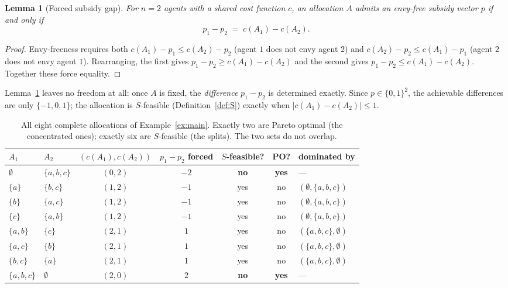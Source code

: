 \documentclass[11pt]{article}
\newtheorem{lemma}[definition]{Lemma}
\begin{document}
\begin{lemma}[Forced subsidy gap]
\label{lem:gap}
For $n=2$ agents with a shared cost function $c$, an allocation $A$ admits an
envy-free subsidy vector $p$ if and only if
\[
  p_1 - p_2 \;=\; c(A_1) - c(A_2).
\]
\end{lemma}

\begin{proof}
Envy-freeness requires both $c(A_1) - p_1 \le c(A_2) - p_2$ (agent $1$ does
not envy agent $2$) and $c(A_2) - p_2 \le c(A_1) - p_1$ (agent $2$ does not
envy agent $1$). Rearranging, the first gives $p_1 - p_2 \ge c(A_1) - c(A_2)$
and the second gives $p_1 - p_2 \le c(A_1) - c(A_2)$. Together these force
equality.
\end{proof}

Lemma~\ref{lem:gap} leaves no freedom at all: once $A$ is fixed, the
\emph{difference} $p_1 - p_2$ is determined exactly. Since $p \in
\{0,1\}^2$, the achievable differences are only $\{-1,0,1\}$; the allocation
is $S$-feasible (Definition~\ref{def:S}) exactly when $|c(A_1)-c(A_2)| \le 1$.

\begin{table}[h]
\centering
\begin{tabular}{@{}llccccl@{}}
\toprule
$A_1$ & $A_2$ & $(c(A_1),c(A_2))$ & $p_1-p_2$ forced & $S$-feasible? & PO? & dominated by \\
\midrule
$\emptyset$   & $\{a,b,c\}$ & $(0,2)$ & $-2$ & \textbf{no} & \textbf{yes} & --- \\
$\{a\}$       & $\{b,c\}$   & $(1,2)$ & $-1$ & yes & no & $(\emptyset,\{a,b,c\})$ \\
$\{b\}$       & $\{a,c\}$   & $(1,2)$ & $-1$ & yes & no & $(\emptyset,\{a,b,c\})$ \\
$\{c\}$       & $\{a,b\}$   & $(1,2)$ & $-1$ & yes & no & $(\emptyset,\{a,b,c\})$ \\
$\{a,b\}$     & $\{c\}$     & $(2,1)$ & $1$  & yes & no & $(\{a,b,c\},\emptyset)$ \\
$\{a,c\}$     & $\{b\}$     & $(2,1)$ & $1$  & yes & no & $(\{a,b,c\},\emptyset)$ \\
$\{b,c\}$     & $\{a\}$     & $(2,1)$ & $1$  & yes & no & $(\{a,b,c\},\emptyset)$ \\
$\{a,b,c\}$   & $\emptyset$ & $(2,0)$ & $2$  & \textbf{no} & \textbf{yes} & --- \\
\bottomrule
\end{tabular}
\caption{All eight complete allocations of Example~\ref{ex:main}. Exactly two
are Pareto optimal (the concentrated ones); exactly six are $S$-feasible (the
splits). The two sets do not overlap.}
\label{tab:eight}
\end{table}
\end{document}

